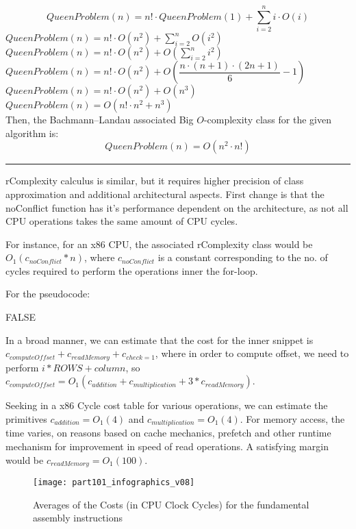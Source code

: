 \[QueenProblem(n) = n! \cdot QueenProblem(1) + \sum_{i=2}^{n} i\cdot O(i) \] 
$QueenProblem(n) = n! \cdot O(n^2) + \sum_{i=2}^{n} O(i^2)$ \\
$QueenProblem(n) = n! \cdot O(n^2) +  O(\sum_{i=2}^{n} i^2)$ \\
$QueenProblem(n) = n! \cdot O(n^2) +  O(\dfrac{n\cdot(n+1)\cdot(2n+1)}{6} - 1)$ \\
$QueenProblem(n) = n! \cdot O(n^2) +  O(n^3)$ \\
$QueenProblem(n) = O(n! \cdot n^2 + n^3) $ \\

Then, the Bachmann–Landau associated Big $O$-complexity class for the given algorithm is:
\[QueenProblem(n) = O(n^2\cdot n!) \]

\noindent\rule{16cm}{0.4pt}

rComplexity calculus is similar, but it requires higher precision of class approximation and additional architectural aspects. 
First change is that the noConflict function has it's performance dependent on the architecture, as not all CPU operations takes the same amount of CPU cycles. 


For instance, for an x86 CPU, the associated rComplexity class would be
$ O_{1}(c_{noConflict} * n) $, where $c_{noConflict}$ is a constant corresponding to the no. of cycles required to perform the operations inner the for-loop.

For the pseudocode:
\begin{algorithmic}[1]
			\State \Return FALSE
		\EndIf
	\EndFor
\end{algorithmic}
In a broad manner, we can estimate that the cost for the inner snippet is $c_{computeOffset} + c_{readMemory} + c_{check=1}$, where in order to compute offset, we need to perform $i * ROWS + column$, so
$ c_{computeOffset} = O_{1}(c_{addition} + c_{multiplication} + 3 * c_{readMemory})$.


Seeking in a x86 Cycle cost table for various operations, we can estimate the primitives $c_{addition} = O_{1}(4)$ and $c_{multiplication} = O_{1}(4)$. For memory access, the time varies, on reasons based on cache mechanics, prefetch and other runtime mechanism for improvement in speed of read operations. A satisfying margin would be $c_{readMemory} = O_{1}(100)$. 

\begin{figure}[H]
\centering
\texttt{[image: part101\_infographics\_v08]}
\caption{Averages of the Costs (in CPU Clock Cycles) for the fundamental assembly instructions \cite{archcost}}
\end{figure}

